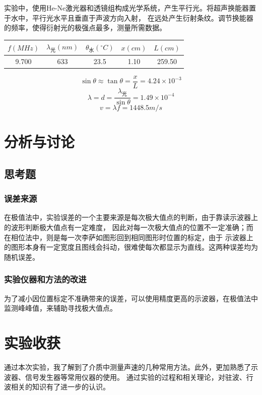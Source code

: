\documentclass{article}
\newcommand{\degreesCelsius}{^\circ C}
\begin{document}
    实验中，使用He-Ne激光器和透镜组构成光学系统，产生平行光。将超声换能器置于水中，平行光水平且垂直于声波方向入射，
    在远处产生衍射条纹。调节换能器的频率，使得衍射光的极强点最多，测量所需数据。

    \begin{center}
        \begin{tabular}{|c|c|c|c|c|}
            \hline
            $f(MHz)$ & $\lambda_{\text{光}}(nm)$ & $\theta_{\text{水}}(\degreesCelsius)$ & $x(cm)$ & $L(cm)$ \\
            \hline
            9.700 & 633 & 23.5 & 1.10 & 259.50 \\
            \hline
        \end{tabular}
    \end{center}

    $$\sin \theta \approx \tan \theta = \frac{x}{L}=4.24\times 10^{-3}$$
    $$\lambda=d=\frac{\lambda_{\text{光}}}{\sin \theta}=1.49\times 10^{-4}$$
    $$v=\lambda f=1448.5m/s$$

    \section{分析与讨论}
    \subsection{思考题}
    \subsubsection{误差来源}
    在极值法中，实验误差的一个主要来源是每次极大值点的判断，由于靠读示波器上的波形判断极大值点有一定难度，
    因此对每一次极大值点的位置不一定准确；而在相位法中，则是每一次李萨如图形回到相同图形时位置的标定，由于
    示波器上的图形本身有一定宽度且图线会抖动，很难使每次都显示为直线。这两种误差均为随机误差。
    \subsubsection{实验仪器和方法的改进}
    为了减小因位置标定不准确带来的误差，可以使用精度更高的示波器，在极值法中监测峰峰值，来辅助寻找极大值点。
    
    \section{实验收获}
    通过本次实验，我了解到了介质中测量声速的几种常用方法。此外，更加熟悉了示波器、信号发生器等常用仪器的使用。
    通过实验的过程和相关理论，对驻波、行波相关的知识有了进一步的认识。
\end{document}
